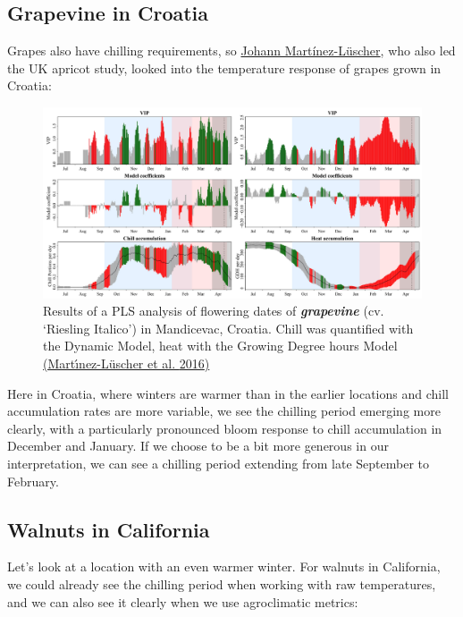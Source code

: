 \documentclass[
]{book}
\begin{document}
\hypertarget{grapevine-in-croatia}{%
\subsection{Grapevine in Croatia}\label{grapevine-in-croatia}}

Grapes also have chilling requirements, so \href{https://scholar.google.es/citations?user=kpIpSXkAAAAJ\&hl}{Johann Martínez-Lüscher}, who also led the UK apricot study, looked into the temperature response of grapes grown in Croatia:

\begin{figure}
\centering
\includegraphics{pictures/PLS_chill_force_grapevine_Croatia.png}
\caption{Results of a PLS analysis of flowering dates of \textbf{\emph{grapevine}} (cv. `Riesling Italico') in Mandicevac, Croatia. Chill was quantified with the Dynamic Model, heat with the Growing Degree hours Model \href{https://www.frontiersin.org/articles/10.3389/fenvs.2016.00048/full}{(Martı́nez-Lüscher et al. \protect\hyperlink{ref-martinez2016sensitivity}{2016})}}
\end{figure}

Here in Croatia, where winters are warmer than in the earlier locations and chill accumulation rates are more variable, we see the chilling period emerging more clearly, with a particularly pronounced bloom response to chill accumulation in December and January. If we choose to be a bit more generous in our interpretation, we can see a chilling period extending from late September to February.

\hypertarget{walnuts-in-california}{%
\subsection{Walnuts in California}\label{walnuts-in-california}}

Let's look at a location with an even warmer winter. For walnuts in California, we could already see the chilling period when working with raw temperatures, and we can also see it clearly when we use agroclimatic metrics:
\end{document}

